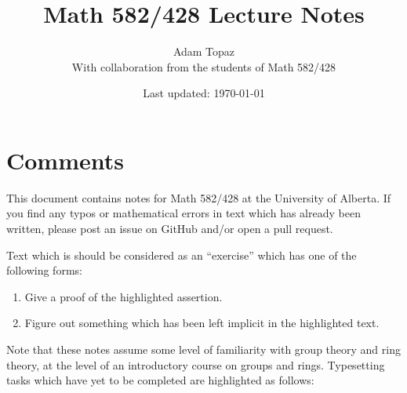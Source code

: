 \documentclass[12pt]{book}
\title{Math 582/428 Lecture Notes}
\date{Last updated: \today}
\author{Adam Topaz \\ With collaboration from the students of Math 582/428}
\begin{document}
\maketitle

\chapter*{Comments}
This document contains notes for Math 582/428 at the University of Alberta.
If you find any typos or mathematical errors in text which has already been written, please post an issue on GitHub and/or open a pull request.

Text which is  should be considered as an ``exercise'' which has one of the following forms:
\begin{enumerate}
\item Give a proof of the highlighted assertion.
\item Figure out something which has been left implicit in the highlighted text.
\end{enumerate}
Note that these notes assume some level of familiarity with group theory and ring theory, at the level of an introductory course on groups and rings.
Typesetting tasks which have yet to be completed are highlighted as follows: 

\tableofcontents
\end{document}
